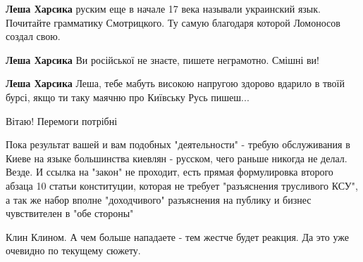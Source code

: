 \begin{itemize}
\begin{itemize}
 
\textbf{Леша Харсика} руским еще в начале 17 века называли украинский язык. Почитайте грамматику Смотрицкого. Ту самую благодаря которой Ломоносов создал свою.

 
\textbf{Леша Харсика} Ви російської не знаєте, пишете неграмотно. Смішні ви!

 
\textbf{Леша Харсика} Леша, тебе мабуть високою напругою здорово вдарило в твоїй бурсі, якщо ти таку маячню про Київську Русь пишеш...

\end{itemize}

 
Вітаю! Перемоги потрібні


Пока результат вашей и вам подобных "деятельности" - требую обслуживания в
Киеве на языке большинства киевлян - русском, чего раньше никогда не делал.
Везде. И ссылка на "закон" не проходит, есть прямая формулировка второго абзаца
10 статьи конституции, которая не требует "разъяснения трусливого КСУ", а так
же набор вполне "доходчивого" разъяснения на публику и бизнес чувствителен в
"обе стороны"

Клин Клином. А чем больше нападаете - тем жестче будет реакция. Да это уже
очевидно по текущему сюжету.


\end{itemize}
